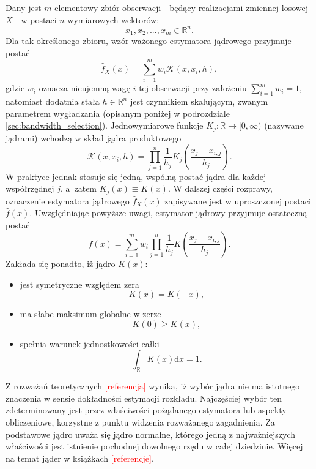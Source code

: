 \documentclass[12pt,a4paper,oneside]{book}
\theoremstyle{definition}
\begin{document}
Dany jest $m$-elementowy zbiór obserwacji - będący realizacjami zmiennej losowej $X$ - w postaci $n$-wymiarowych wektorów:
\begin{equation} \label{eq:kde_dataset}
x_1, x_2, ..., x_m \in \mathbb{R}^n.
\end{equation}
Dla tak określonego zbioru, wzór ważonego estymatora jądrowego przyjmuje postać
\begin{equation} \label{eq:kde1}
\hat{f}_X(x) = \sum_{i=1}^m w_i \mathcal{K} (x,x_i,h),
\end{equation}
gdzie $w_i$ oznacza nieujemną wagę $i$-tej obserwacji przy założeniu $\sum_{i=1}^m w_i=1$, natomiast dodatnia stała $h \in \mathbb{R}^n$ jest czynnikiem skalującym, zwanym parametrem wygładzania (opisanym poniżej w podrozdziale \ref{sec:bandwidth_selection}). Jednowymiarowe funkcje $K_j:\mathbb{R} \rightarrow [0,\infty)$  (nazywane jądrami) wchodzą w skład jądra produktowego
\begin{equation}\label{eq:product_kernel}
\mathcal{K}(x,x_i,h) = \prod_{j=1}^n \frac{1}{h_j} K_j \left( \frac{x_j-x_{i,j}}{h_j} \right).
\end{equation}
W praktyce jednak stosuje się jedną, wspólną postać jądra dla każdej współrzędnej $j$, a~zatem $K_j(x) \equiv K(x)$. W dalszej części rozprawy, oznaczenie estymatora jądrowego $\hat{f}_X(x)$ zapisywane jest w uproszczonej postaci $\hat{f}(x)$. Uwzględniając powyższe uwagi, estymator jądrowy przyjmuje ostateczną postać
\begin{equation} \label{eq:kde2}
\hat{f}(x) = \sum_{i=1}^m w_i \prod_{j=1}^n \frac{1}{h_j} K \left( \frac{x_j-x_{i,j}}{h_j} \right).
\end{equation}
Zakłada się ponadto, iż jądro $K(x)$:
\begin{itemize}
\item jest symetryczne względem zera
\begin{equation} \label{eq:kernel_cond1}
K(x) = K(-x),
\end{equation}
\item ma słabe maksimum globalne w zerze
\begin{equation} \label{eq:kernel_cond2}
K(0) \geq K(x),
\end{equation}
\item spełnia warunek jednostkowości całki
\begin{equation} \label{eq:kernel_cond3}
\int_\mathbb{R} K(x) \mathrm{d}x = 1.
\end{equation}
\end{itemize}
Z rozważań teoretycznych \textcolor{red}{[referencja]} wynika, iż wybór jądra nie ma istotnego znaczenia w sensie dokładności estymacji rozkładu. Najczęściej wybór ten zdeterminowany jest przez właściwości pożądanego estymatora lub aspekty obliczeniowe, korzystne z punktu widzenia rozważanego zagadnienia. Za podstawowe jądro uważa się jądro normalne, którego jedną z najważniejszych właściwości jest istnienie pochodnej dowolnego rzędu w całej dziedzinie. Więcej na temat jąder w książkach \textcolor{red}{[referencje]}.
\end{document}
